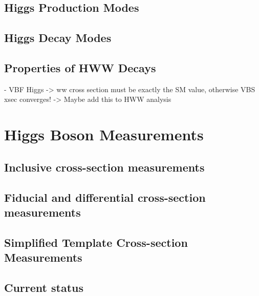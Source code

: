 \subsection{Higgs Production Modes}
\subsection{Higgs Decay Modes}
\subsection{Properties of HWW Decays}
- VBF Higgs -> ww cross section must be exactly the SM value, otherwise VBS xsec converges!
-> Maybe add this to HWW analysis

\section{Higgs Boson Measurements}

\subsection{Inclusive cross-section measurements}
\subsection{Fiducial and differential cross-section measurements}
\subsection{Simplified Template Cross-section Measurements}
\subsection{Current status}
